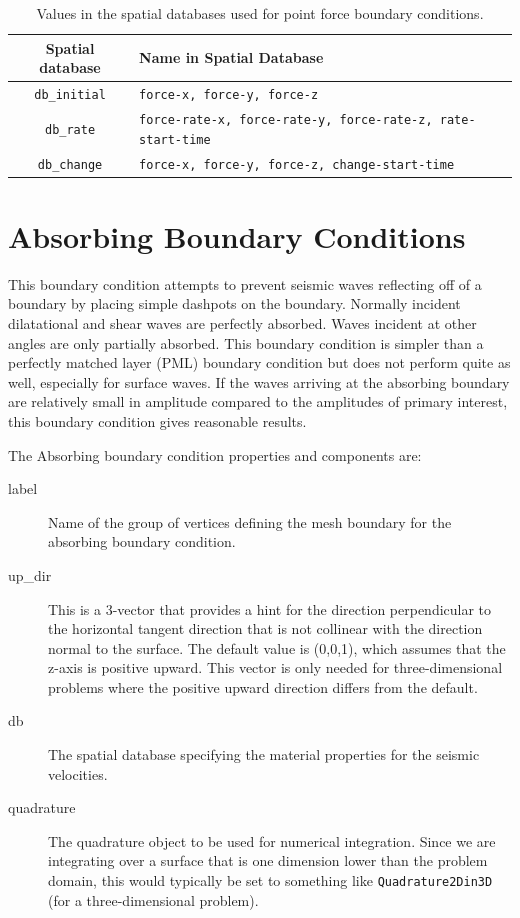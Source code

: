 \noindent \begin{center}
\begin{table}[H]
\noindent \centering{}\caption{Values in the spatial databases used for point force boundary conditions.}
\medskip{}
\begin{tabular}{|c|>{\centering}p{4in}|}
\hline 
\textbf{Spatial database} & \textbf{Name in Spatial Database}\tabularnewline
\hline 
\hline 
\texttt{db\_initial} & \texttt{force-x, force-y, force-z}\tabularnewline
\hline 
\texttt{db\_rate} & \texttt{force-rate-x, force-rate-y, force-rate-z, rate-start-time}\tabularnewline
\hline 
\texttt{db\_change} & \texttt{force-x, force-y, force-z, change-start-time}\tabularnewline
\hline 
\end{tabular}
\end{table}

\par\end{center}


\section{\label{sec:absorbing:boundaries}Absorbing Boundary Conditions}

This boundary condition attempts to prevent seismic waves reflecting
off of a boundary by placing simple dashpots on the boundary. Normally
incident dilatational and shear waves are perfectly absorbed. Waves
incident at other angles are only partially absorbed. This boundary
condition is simpler than a perfectly matched layer (PML) boundary
condition but does not perform quite as well, especially for surface
waves. If the waves arriving at the absorbing boundary are relatively
small in amplitude compared to the amplitudes of primary interest,
this boundary condition gives reasonable results.

The Absorbing boundary condition properties and components are:
\begin{description}
\item [{label}] Name of the group of vertices defining the mesh boundary
for the absorbing boundary condition.
\item [{up\_dir}] This is a 3-vector that provides a hint for the direction
perpendicular to the horizontal tangent direction that is not collinear
with the direction normal to the surface. The default value is (0,0,1),
which assumes that the z-axis is positive upward. This vector is only
needed for three-dimensional problems where the positive upward direction
differs from the default.
\item [{db}] The spatial database specifying the material properties for
the seismic velocities.
\item [{quadrature}] The quadrature object to be used for numerical integration.
Since we are integrating over a surface that is one dimension lower
than the problem domain, this would typically be set to something
like \texttt{Quadrature2Din3D} (for a three-dimensional problem).
\end{description}

